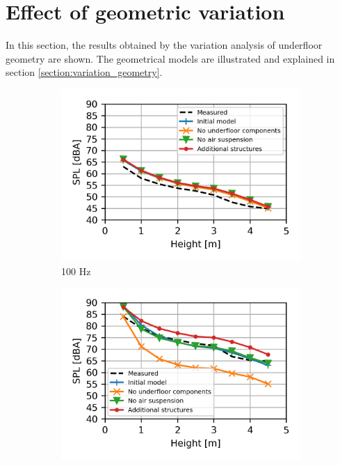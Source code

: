 \section{Effect of geometric variation}

In this section, the results obtained by the variation analysis of underfloor geometry are shown. The geometrical models are illustrated and explained in section \ref{section:variation_geometry}.

\begin{figure}[H]
	\centering
	\begin{subfigure}[b]{0.49\textwidth}
		\centering
		\includegraphics{fig/chap5/geometry_variation/third_octave_over_height/100_Hz.png}
		\caption{100 Hz}
	\end{subfigure}
	\begin{subfigure}[b]{0.49\textwidth}
		\centering
		\includegraphics{fig/chap5/geometry_variation/third_octave_over_height/250_Hz.png}

\end{subfigure}
\end{figure}
